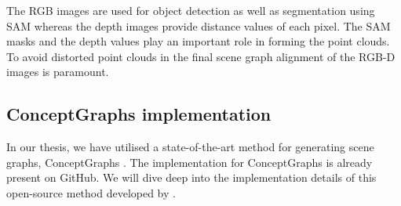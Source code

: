 The RGB images are used for object detection as well as segmentation using SAM whereas the depth images provide distance values of each pixel.
The SAM masks and the depth values play an important role in forming the point clouds. To avoid distorted point clouds in the final scene graph 
alignment of the RGB-D images is paramount.

\subsection{ConceptGraphs implementation}
In our thesis, we have utilised a state-of-the-art method for generating scene graphs, ConceptGraphs \cite{gu2023conceptgraphsopenvocabulary3dscene}.
 The implementation for ConceptGraphs is already present on GitHub. We will dive deep into the implementation details of this open-source method developed by \citet{gu2023conceptgraphsopenvocabulary3dscene}.

